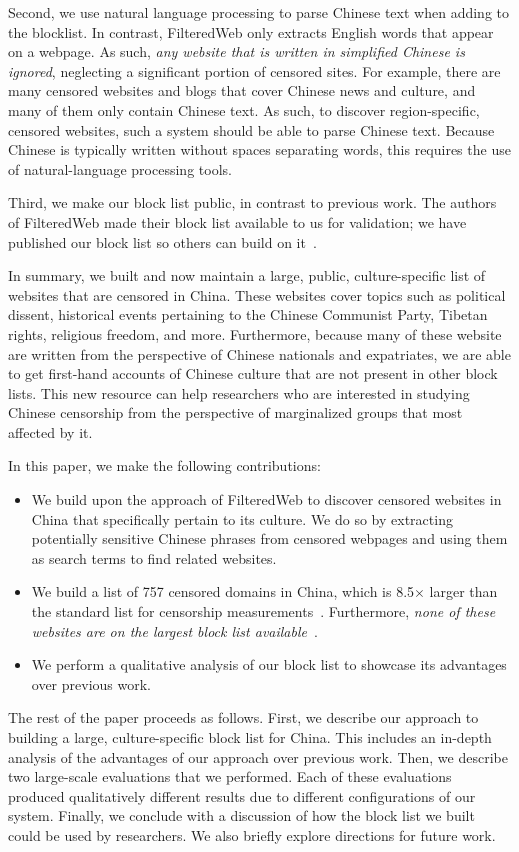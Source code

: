Second, we use natural language processing to parse Chinese text
when adding to the blocklist. In contrast, FilteredWeb only extracts English
words that appear on a webpage. As such, \textit{any website that is written
in simplified Chinese is ignored}, neglecting a significant portion of
censored sites. For example, there are many censored websites and blogs that
cover Chinese news and culture, and many of them only contain Chinese text. As
such, to discover region-specific, censored websites, such a system should be
able to parse Chinese text. Because Chinese is typically written without
spaces separating words, this requires the use of natural-language processing
tools.

Third, we make our block list public, in contrast to previous work. The
authors of FilteredWeb made their block list available to us for validation;
we have published our block list so others can build on
it~\cite{censorsearch-lists}.

In summary, we built and now maintain a large, public, culture-specific list
of websites that are censored in China. These websites cover topics such as
political dissent, historical events pertaining to the Chinese Communist
Party, Tibetan rights, religious freedom, and more. Furthermore, because many
of these website are written from the perspective of Chinese nationals and expatriates,
we are able to get first-hand accounts of Chinese culture that are
not present in other block lists. This new resource can help researchers who
are interested in studying Chinese censorship from the perspective of
marginalized groups that most affected by it.

In this paper, we make the following contributions:
\begin{itemize}
  \item We build upon the approach of FilteredWeb to discover censored
websites in China that specifically pertain to its culture. We do so
by extracting potentially sensitive Chinese phrases from censored
webpages and using them as search terms to find related websites.
  \item We build a list of 757 censored domains in China, which is
8.5$\times$ larger than the standard list for censorship
measurements~\cite{citizenlab:block}. Furthermore, \textit{none of
these websites are on the largest block list
available}~\cite{darer2017filteredweb}.
  \item We perform a qualitative analysis of our block list to
    showcase its advantages over previous work.
\end{itemize}

The rest of the paper proceeds as follows. First, we describe our
approach to building a large, culture-specific block list for
China. This includes an in-depth analysis of the advantages of our
approach over previous work. Then, we describe two large-scale
evaluations that we performed. Each of these evaluations
produced qualitatively different results due to different
configurations of our system. Finally, we conclude
with a discussion of how the block list we built could be used by
researchers. We also briefly explore directions for future work.
